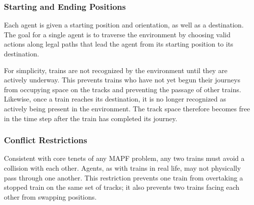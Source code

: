 \documentclass[11pt]{article}
\begin{document}
\subsubsection{Starting and Ending Positions}
\label{sec:Positions}
Each agent is given a starting position and orientation, as well as a destination.  The goal for a single agent is to traverse the environment by choosing valid actions along legal paths that lead the agent from its starting position to its destination.  

For simplicity, trains are not recognized by the environment until they are actively underway.  This prevents trains who have not yet begun their journeys from occupying space on the tracks and preventing the passage of other trains.  Likewise, once a train reaches its destination, it is no longer recognized as actively being present in the environment.  The track space therefore becomes free in the time step after the train has completed its journey.

\subsubsection{Conflict Restrictions}
\label{sec:Conflicts}
Consistent with core tenets of any MAPF problem, any two trains must avoid a collision with each other.  Agents, as with trains in real life, may not physically pass through one another.  This restriction prevents one train from overtaking a stopped train on the same set of tracks; it also prevents two trains facing each other from swapping positions.



\end{document}
